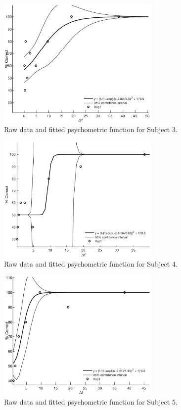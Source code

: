 \begin{figure}[H]
\centering
\includegraphics[width = 0.7\textwidth]{Figure/Vores_Figurer/Subject3} 
\caption{Raw data and fitted psychometric function for Subject 3.}
\label{fig:Subject3}
\end{figure}

\begin{figure}[H]
\centering
\includegraphics[width = 0.7\textwidth]{Figure/Vores_Figurer/Subject4} 
\caption{Raw data and fitted psychometric function for Subject 4.}
\label{fig:Subject4}
\end{figure}

\begin{figure}[H]
\centering
\includegraphics[width = 0.7\textwidth]{Figure/Vores_Figurer/Subject5} 
\caption{Raw data and fitted psychometric function for Subject 5.}
\label{fig:Subject5}
\end{figure}


